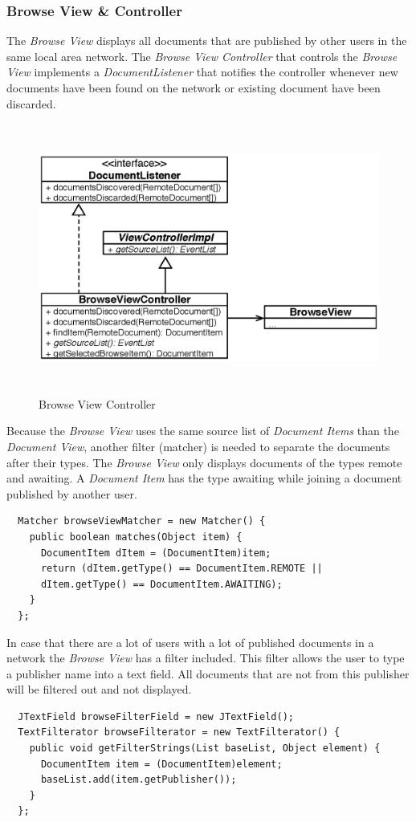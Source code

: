\subsubsection{Browse View \& Controller}
The \textit{Browse View} displays all documents that are published by other users in the same local area network. The \textit{Browse View Controller} that controls the \textit{Browse View} implements a \textit{DocumentListener} that notifies the controller whenever new documents have been found on the network or existing document have been discarded.
\begin{figure}[H]
\begin{center}
  \includegraphics[height=3.5in, width=5.62in]{../images/finalreport/application_browseview.eps}
\caption{Browse View Controller}
\label{application_browseview}
\end{center}
\end{figure}

Because the \textit{Browse View} uses the same source list of \textit{Document Items} than the \textit{Document View}, another filter (matcher) is needed to separate the documents after their types. The \textit{Browse View} only displays documents of the types remote and awaiting. A \textit{Document Item} has the type awaiting while joining a document published by another user.
\begin{verbatim}
  Matcher browseViewMatcher = new Matcher() {
    public boolean matches(Object item) {
      DocumentItem dItem = (DocumentItem)item;
      return (dItem.getType() == DocumentItem.REMOTE ||
      dItem.getType() == DocumentItem.AWAITING);
    }
  };
\end{verbatim}
In case that there are a lot of users with a lot of published documents in a network the \textit{Browse View} has a filter included. This filter allows the user to type a publisher name into a text field. All documents that are not from this publisher will be filtered out and not displayed.
\begin{verbatim}
  JTextField browseFilterField = new JTextField();
  TextFilterator browseFilterator = new TextFilterator() {
    public void getFilterStrings(List baseList, Object element) {
      DocumentItem item = (DocumentItem)element;
      baseList.add(item.getPublisher());
    }
  };
\end{verbatim}

